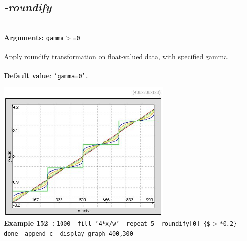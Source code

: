 \documentclass[a4paper,11pt,twoside]{book}
\begin{document}
\subsection{\emph{-roundify} }\vspace*{-0.5em}
~\\\textbf{Arguments: } 
{\small \texttt{gamma$>$=0}}\\~\\
Apply roundify transformation on float-valued data, with specified gamma.
~\\~\\\textbf{Default value}: {\small \texttt{'gamma=0'.}}
\begin{center}\includegraphics[keepaspectratio=true,height=7cm,width=\textwidth]{img/gmic_def152.jpg}\\
{\footnotesize \textbf{Example 152~:} \texttt{1000 -fill '4*x/w' -repeat 5 --roundify[0] \{\$$>$*0.2\} -done -append c -display\_graph 400,300}}
\end{center}
\end{document}
